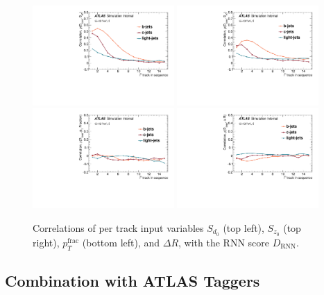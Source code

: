\begin{figure}[htbp]
  \centering
 \includegraphics[width=0.48\textwidth]{figures/RNN/Corr_Sd0.pdf}
 \includegraphics[width=0.48\textwidth]{figures/RNN/Corr_Sz0.pdf}
 \includegraphics[width=0.48\textwidth]{figures/RNN/Corr_pTFrac.pdf}
 \includegraphics[width=0.48\textwidth]{figures/RNN/Corr_DeltaR.pdf}

\caption{Correlations of per track input variables $S_{d_0}$ (top left), $S_{z_0}$ (top right), $p_T^{\textrm{frac}}$ (bottom left), and $\Delta R$, with the RNN score $D_{\mathrm{RNN}}$.}
  \label{fig:input_output_corrs}
\end{figure}


\subsection{Combination with ATLAS Taggers}

